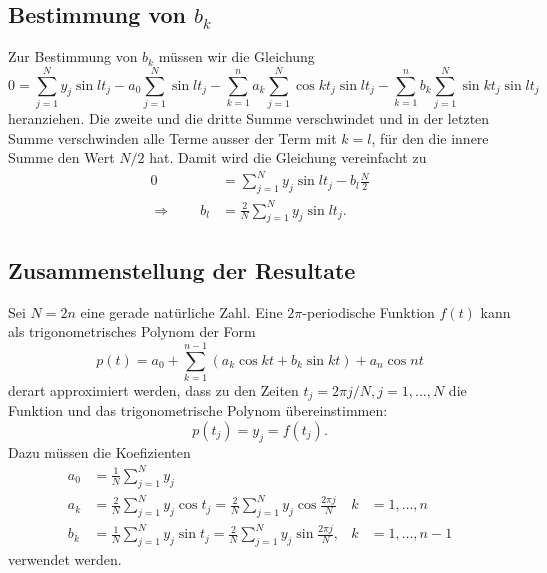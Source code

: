 \subsection{Bestimmung von $b_k$}
Zur Bestimmung von $b_k$ müssen wir die Gleichung
\[
0=\sum_{j=1}^N y_j\sin lt_j 
-a_0\sum_{j=1}^N \sin lt_j
-\sum_{k=1}^na_k\sum_{j=1}^N\cos kt_j\sin lt_j
-\sum_{k=1}^nb_k\sum_{j=1}^N\sin kt_j\sin lt_j
\]
heranziehen.
Die zweite und die dritte Summe verschwindet und in der letzten Summe
verschwinden alle Terme ausser der Term mit $k=l$, für den die
innere Summe den Wert $N/2$ hat.
Damit wird die Gleichung vereinfacht zu
\begin{align*}
0
&=
\sum_{j=1}^Ny_j\sin lt_j - b_l\frac{N}2
\\
\Rightarrow\qquad
b_l
&=
\frac{2}{N}\sum_{j=1}^Ny_j\sin lt_j.
\end{align*}

\subsection{Zusammenstellung der Resultate}
Sei $N=2n$ eine gerade natürliche Zahl.
Eine $2\pi$-periodische Funktion $f(t)$ kann als trigonometrisches Polynom
der Form
\[
p(t)
=
a_0 + \sum_{k=1}^{n-1} (a_k\cos kt + b_k\sin kt) + a_n\cos nt
\]
derart approximiert werden, dass zu den Zeiten $t_j=2\pi j/N, j=1,\dots,N$ 
die Funktion und das trigonometrische Polynom übereinstimmen:
\[
p(t_j) = y_j = f(t_j).
\]
Dazu müssen die Koefizienten
\begin{align*}
a_0
&=
\frac{1}N
\sum_{j=1}^N y_j
\\
a_k
&=
\frac{2}N
\sum_{j=1}^N y_j\cos t_j
=
\frac{2}N
\sum_{j=1}^N y_j\cos \frac{2\pi j}{N}&k&=1,\dots,n
\\
b_k
&=
\frac{1}N
\sum_{j=1}^N y_j\sin t_j
=
\frac{2}N
\sum_{j=1}^N y_j\sin \frac{2\pi j}{N},&k&=1,\dots,n-1
\end{align*}
verwendet werden.


